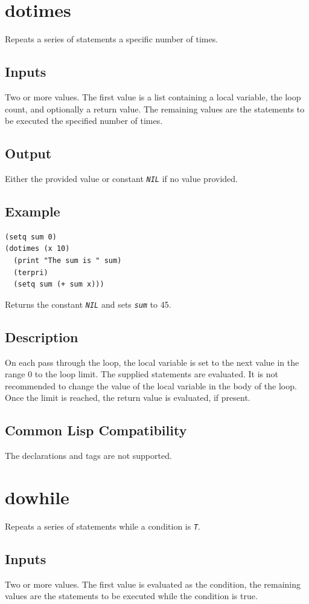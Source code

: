 \documentclass[10pt, openany]{book}
\newcommand{\constant}[1]{\emph{\texttt{#1}}}
\begin{document}
\section{dotimes}
Repeats a series of statements a specific number of times.
\subsection{Inputs}
Two or more values.  The first value is a list containing a local variable, the loop count, and optionally a return value.  The remaining values are the statements to be executed the specified number of times.
\subsection{Output}
Either the provided value or constant \constant{NIL} if no value provided.
\subsection{Example}
\begin{lstlisting}
(setq sum 0)
(dotimes (x 10)
  (print "The sum is " sum)
  (terpri)
  (setq sum (+ sum x)))
\end{lstlisting}
Returns the constant \constant{NIL} and sets \constant{sum} to 45.
\subsection{Description}
On each pass through the loop, the local variable is set to the next value in the range 0 to the loop limit.  The supplied statements are evaluated.  It is not recommended to change the value of the local variable in the body of the loop.  Once the limit is reached, the return value is evaluated, if present.
\subsection{Common Lisp Compatibility}
The declarations and tags are not supported.

\section{dowhile}
Repeats a series of statements while a condition is \constant{T}.
\subsection{Inputs}
Two or more values.  The first value is evaluated as the condition, the remaining values are the statements to be executed while the condition is true.
\end{document}
